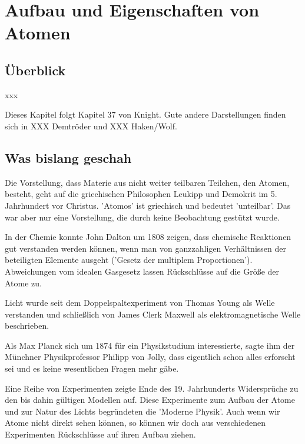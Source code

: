 \renewcommand{\lastmod}{10. September 2024}
\renewcommand{\chapterauthors}{Markus Lippitz}

\chapter{Aufbau und Eigenschaften von Atomen}





\section{Überblick}

xxx

Dieses Kapitel folgt Kapitel 37 von Knight. Gute andere Darstellungen finden sich in XXX Demtröder und XXX Haken/Wolf.


\section{Was bislang geschah}

Die Vorstellung, dass Materie aus nicht weiter teilbaren Teilchen, den Atomen, besteht, geht auf die griechischen Philosophen Leukipp und Demokrit im 5. Jahrhundert vor Christus. 'Atomos' ist griechisch und bedeutet 'unteilbar'. Das war aber nur eine Vorstellung, die durch keine Beobachtung gestützt wurde.

In der Chemie konnte John Dalton um 1808 zeigen, dass chemische Reaktionen gut verstanden werden können, wenn man von ganzzahligen Verhältnissen der beteiligten Elemente ausgeht ('Gesetz der multiplem Proportionen'). Abweichungen vom idealen Gasgesetz lassen Rückschlüsse auf die Größe der Atome zu.

Licht wurde seit dem Doppelspaltexperiment von Thomas Young als Welle verstanden und schließlich von  James Clerk Maxwell als elektromagnetische Welle beschrieben.

Als Max Planck sich um 1874 für ein Physikstudium interessierte, sagte ihm der Münchner Physikprofessor Philipp von Jolly, dass eigentlich schon alles erforscht sei und es keine wesentlichen Fragen mehr gäbe.

Eine Reihe von Experimenten zeigte Ende des 19. Jahrhunderts Widersprüche zu den bis dahin gültigen Modellen auf. Diese Experimente zum Aufbau der Atome und zur Natur des Lichts begründeten die 'Moderne Physik'. Auch wenn wir Atome nicht direkt sehen können, so können wir doch aus verschiedenen Experimenten Rückschlüsse auf ihren Aufbau ziehen.

